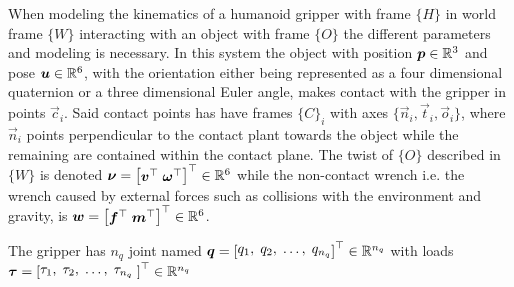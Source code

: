 \begin{center}
\begin{minipage}{.48\linewidth}
    \end{minipage}%
    \vspace{15pt}
    \begin{minipage}[t]{.48\linewidth}
        \vspace{0pt}
        \captionsetup{type=figure}
        \label{fig:friction-contact-distribution}
    \end{minipage}%
    \hfill%
    \begin{minipage}[t]{.48\linewidth}
        \vspace{0pt}
        \captionsetup{type=figure}
        \label{fig:force-closure-model}
    \end{minipage}%
\end{center}

When modeling the kinematics of a humanoid gripper with frame $\{H\}$ in world frame $\{W\}$ interacting with an object with frame $\{O\}$ the different parameters and modeling is necessary. In this system the object with position $\bm{p}\in\mathbb{R}^3$ and pose $\bm{u}\in\mathbb{R}^6$, with the orientation either being represented as a four dimensional quaternion or a three dimensional Euler angle, makes contact with the gripper in points $\vec{c}_i$. Said contact points has have frames $\{C\}_i$ with axes $\{\vec{n}_i,\vec{t}_i,\vec{o}_i\}$, where $\vec{n}_i$ points perpendicular to the contact plant towards the object while the remaining are contained within the contact plane. The twist of $\{O\}$ described in $\{W\}$ is denoted $\vec{\nu} = \rvec{\vec{v}^\T\; \vec{\omega}^\T}^\T\in\R^6 $ while the non-contact wrench i.e. the wrench caused by external forces such as collisions with the environment and gravity, is $\vec{w} = \rvec{\vec{f}^\T\; \vec{m}^\T}^\T\in\R^6$. \medskip

The gripper has $n_q$ joint named $\vec{q} = \rvec{q_1,\; q_2,\; \dots,\; q_{n_q}}^\T\in\R^{n_q}$ with loads $\vec{\tau} = \rvec{\tau_1,\;\tau_2,\;\dots,\;\tau_{n_q}\;}^\T\in\R^{n_q}$

% 






